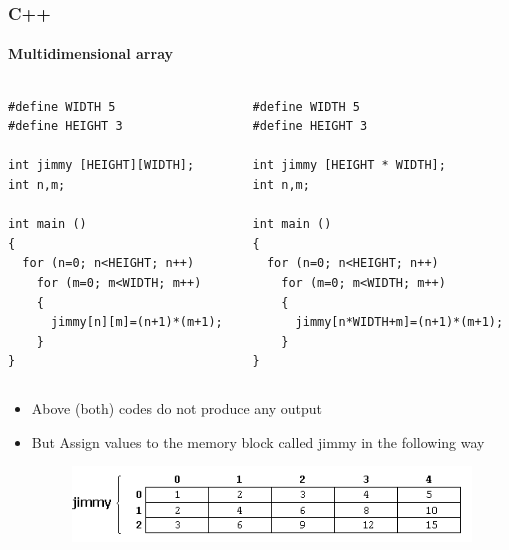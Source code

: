 \documentclass[hyperref={pdfpagelabels=true}]{beamer}
\begin{document}
\begin{frame}[fragile]
\frametitle{C++}
\framesubtitle{Multidimensional array}
{\tiny{
	\begin{columns}[t]
  		\begin{column}{5cm}
    			\begin{verbatim}
#define WIDTH 5
#define HEIGHT 3

int jimmy [HEIGHT][WIDTH];
int n,m;

int main ()
{
  for (n=0; n<HEIGHT; n++)
    for (m=0; m<WIDTH; m++)
    {
      jimmy[n][m]=(n+1)*(m+1);
    }
}
	\end{verbatim}
  		\end{column}
  		\begin{column}{5cm}
\begin{verbatim}
#define WIDTH 5
#define HEIGHT 3

int jimmy [HEIGHT * WIDTH];
int n,m;

int main ()
{
  for (n=0; n<HEIGHT; n++)
    for (m=0; m<WIDTH; m++)
    {
      jimmy[n*WIDTH+m]=(n+1)*(m+1);
    }
}
\end{verbatim}
  		\end{column}
	\end{columns}}}
\pause
\begin{itemize}[<+->]
\item Above (both) codes do not produce any output
\item But Assign values to the memory block called jimmy in the following way
\begin{figure}[!tbp]
\centering
\includegraphics[scale = 0.5]{figs/Selection_023.png}
\end{figure}
\end{itemize}
\end{frame}
\end{document}
